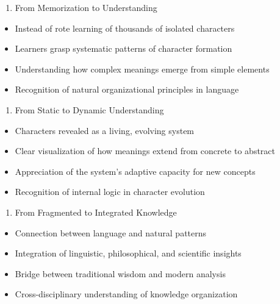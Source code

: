 \documentclass[
  11pt,
  letterpaper,
]{article}
\providecommand{\tightlist}{%
  \setlength{\itemsep}{0pt}\setlength{\parskip}{0pt}}
\begin{document}
\begin{enumerate}
\def\labelenumi{\arabic{enumi}.}
\tightlist
\item
  From Memorization to Understanding
\end{enumerate}

\begin{itemize}
\tightlist
\item
  Instead of rote learning of thousands of isolated characters
\item
  Learners grasp systematic patterns of character formation
\item
  Understanding how complex meanings emerge from simple elements
\item
  Recognition of natural organizational principles in language
\end{itemize}

\begin{enumerate}
\def\labelenumi{\arabic{enumi}.}
\setcounter{enumi}{1}
\tightlist
\item
  From Static to Dynamic Understanding
\end{enumerate}

\begin{itemize}
\tightlist
\item
  Characters revealed as a living, evolving system
\item
  Clear visualization of how meanings extend from concrete to abstract
\item
  Appreciation of the system's adaptive capacity for new concepts
\item
  Recognition of internal logic in character evolution
\end{itemize}

\begin{enumerate}
\def\labelenumi{\arabic{enumi}.}
\setcounter{enumi}{2}
\tightlist
\item
  From Fragmented to Integrated Knowledge
\end{enumerate}

\begin{itemize}
\tightlist
\item
  Connection between language and natural patterns
\item
  Integration of linguistic, philosophical, and scientific insights
\item
  Bridge between traditional wisdom and modern analysis
\item
  Cross-disciplinary understanding of knowledge organization
\end{itemize}
\end{document}
